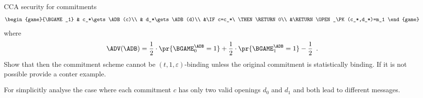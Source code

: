 \documentclass{crypto-exercise}
\begin{document}
\begin{exercise}{CCA security for commitments}
\begin{align*}
\begin{game}{\BGAME_1}
& c_*\gets \ADB(c)\\
& d_*\gets \ADB(d)\\
&\IF c=c_*\ \THEN \RETURN 0\\
&\RETURN \OPEN_\PK(c_*,d_*)=m_1
\end{game}
\end{align*}  
where 
\begin{align*}
\ADV(\ADB)=\frac{1}{2}\cdot\pr{\BGAME_0^\ADB=1}+\frac{1}{2}\cdot\pr{\BGAME_1^\ADB=1}-\frac{1}{2}\enspace.
\end{align*}
Show that then the commitment scheme cannot be $(t,1,\varepsilon)$-binding unless the original commitment is statistically binding. If it is not possible provide a conter example.
\end{exercise}
\begin{solution} 
For simplicitly analyse the case where each commitment $c$ has only two valid openings $d_0$ and $d_1$ and both lead to different messages.  


\end{solution}
\end{document}
